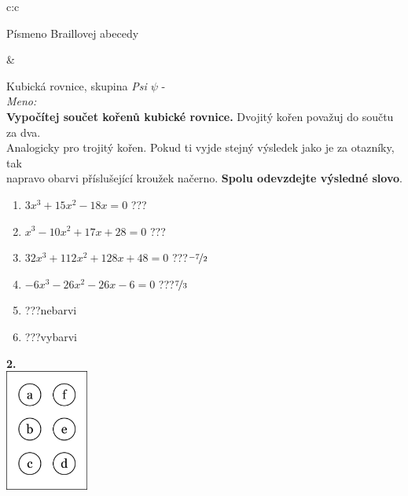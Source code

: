 \documentclass[10pt]{report}
\begin{document}
\begin{tabular}{c:c}
\begin{minipage}[c][99mm][t]{0.49\linewidth}
\begin{center}
\begin{minipage}{0.20\linewidth}
\begin{center}
{\small Písmeno Braillovej abecedy}
\end{center}
\end{minipage}
\end{center}
\end{minipage}
&
\begin{minipage}[c][99mm][t]{0.49\linewidth}
\begin{center}
\vspace{7mm}
{\huge Kubická rovnice, skupina \textit{Psi $\psi$} -}\\[4.5mm]
\textit{Meno:}\phantom{xxxxxxxxxxxxxxxxxxxxxxxxxxxxxxxxxxxxxxxxxxxxxxxxxxxxxxxxxxxxxxxxx}\\[3.5mm]
\textbf{Vypočítej součet kořenů kubické rovnice.} Dvojitý kořen považuj do součtu za dva.\\Analogicky pro trojitý kořen. Pokud ti vyjde stejný výsledek jako je za otazníky, tak\\napravo obarvi příslušející kroužek načerno. \textbf{Spolu odevzdejte výsledné slovo}.\\[3mm]
\begin{minipage}{0.77\linewidth}
\begin{center}
\begin{varwidth}{\textwidth}
\begin{enumerate}
\large
\item $3x^3+15x^2-18x=0$\quad \dotfill\; ???\;\dotfill {}
\item $x^3-10x^2+17x+28=0$\quad \dotfill\; ???\;\dotfill {}
\item $32x^3+112x^2+128x+48=0$\quad \dotfill\; ???\;\dotfill \quad $\nicefrac{-7}{2}$
\item $-6x^3-26x^2-26x-6=0$\quad \dotfill\; ???\;\dotfill \quad $\nicefrac{7}{3}$
\item \quad \dotfill\; ???\;\dotfill \quad nebarvi
\item \quad \dotfill\; ???\;\dotfill \quad vybarvi
\end{enumerate}
\end{varwidth}
\end{center}
\end{minipage}
\begin{minipage}{0.20\linewidth}
\begin{center}
{\Huge\bfseries 2.} \\[2mm]
\includegraphics[height=40mm]{../images/braille.png}

\end{center}
\end{minipage}
\end{center}
\end{minipage}
\end{tabular}
\end{document}
